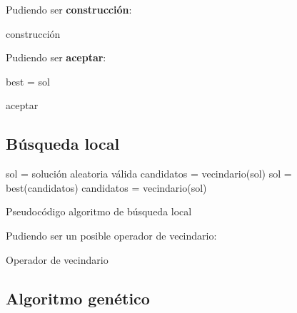 \documentclass[13pt,a4paper]{article}
\begin{document}
Pudiendo ser \textbf{construcción}:

\begin{algorithm}[H]
    \SetAlgoLined
    \caption{construcción}
\end{algorithm}

\vspace{\baselineskip}

Pudiendo ser \textbf{aceptar}:

\begin{algorithm}[H]
    \SetAlgoLined
        best = sol \;
    \caption{aceptar}
\end{algorithm}


\subsection{Búsqueda local}

\begin{algorithm}[H]
    \SetAlgoLined
        sol = solución aleatoria válida \;
        candidatos = vecindario(sol) \;
         {
            sol = best(candidatos) \;
            candidatos = vecindario(sol) \;
        }        
    \caption{Pseudocódigo algoritmo de búsqueda local}
\end{algorithm}

\vspace{\baselineskip}

Pudiendo ser un posible operador de vecindario:

\begin{algorithm}[H]
    \SetAlgoLined
    \caption{Operador de vecindario}
\end{algorithm}


\subsection{Algoritmo genético}

\end{document}
